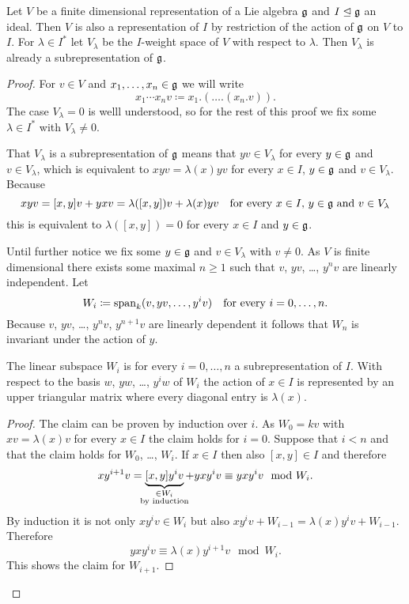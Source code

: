 \begin{lem}
 Let $V$ be a finite dimensional representation of a Lie algebra $\mathfrak{g}$ and $I \trianglelefteq \mathfrak{g}$ an ideal. Then $V$ is also a representation of $I$ by restriction of the action of $\mathfrak{g}$ on $V$ to $I$. For $\lambda \in I^*$ let $V_\lambda$ be the $I$-weight space of $V$ with respect to $\lambda$. Then $V_\lambda$ is already a subrepresentation of $\mathfrak{g}$.
\end{lem}
\begin{proof}
 For $v \in V$ and $x_1, \dotsc, x_n \in \mathfrak{g}$ we will write
 \[
  x_1 \dotsm x_n v \coloneqq x_1.(\dotsc.(x_n.v)).
 \]
 The case $V_\lambda = 0$ is welll understood, so for the rest of this proof we fix some $\lambda \in I^*$ with $V_\lambda \neq 0$.
 
 That $V_\lambda$ is a subrepresentation of $\mathfrak{g}$ means that $yv \in V_\lambda$ for every $y \in \mathfrak{g}$ and $v \in V_\lambda$, which is equivalent to $xyv = \lambda(x)yv$ for every $x \in I$, $y \in \mathfrak{g}$ and $v \in V_\lambda$. Because
 \[
  xyv = [x,y]v + yxv = \lambda([x,y])v + \lambda(x)yv \quad \text{for every $x \in I$, $y \in \mathfrak{g}$ and $v \in V_\lambda$}
 \]
 this is equivalent to $\lambda([x,y]) = 0$ for every $x \in I$ and $y \in \mathfrak{g}$.
 
 Until further notice we fix some $y \in \mathfrak{g}$ and $v \in V_\lambda$ with $v \neq 0$. As $V$ is finite dimensional there exists some maximal $n \geq 1$ such that $v$, $yv$, \dots, $y^n v$ are linearly independent. Let
 \[
  W_i \coloneqq \operatorname{span}_k(v, yv, \dotsc, y^i v) \quad \text{for every $i = 0, \dotsc, n$}.
 \]
 Because $v$, $yv$, \dots, $y^n v$, $y^{n+1} v$ are linearly dependent it follows that $W_n$ is invariant under the action of $y$.
 
 \begin{claim*}
  The linear subspace $W_i$ is for every $i = 0, \dotsc, n$ a subrepresentation of $I$. With respect to the basis $w$, $yw$, \dots, $y^i w$ of $W_i$ the action of $x \in I$ is represented by an upper triangular matrix where every diagonal entry is $\lambda(x)$.
 \end{claim*}
 \begin{proof}
  The claim can be proven by induction over $i$. As $W_0 = kv$ with $xv = \lambda(x)v$ for every $x \in I$ the claim holds for $i = 0$. Suppose that $i < n$ and that the claim holds for $W_0$, \dots, $W_i$. If $x \in I$ then also $[x,y] \in I$ and therefore
  \[
   x y^{i+1} v
   = \underbrace{[x,y] y^i v}_{\mathclap{\substack{\in W_i \\ \text{by induction}}}} + y x y^i v
   \equiv y x y^i v
   \mod W_i.
  \]
  By induction it is not only $x y^i v \in W_i$ but also $x y^i v + W_{i-1} = \lambda(x) y^i v + W_{i-1}$. Therefore
  \[
   y x y^i v \equiv \lambda(x) y^{i+1} v \mod W_i.
  \]
  This shows the claim for $W_{i+1}$.
 \end{proof}
 

\end{proof}
